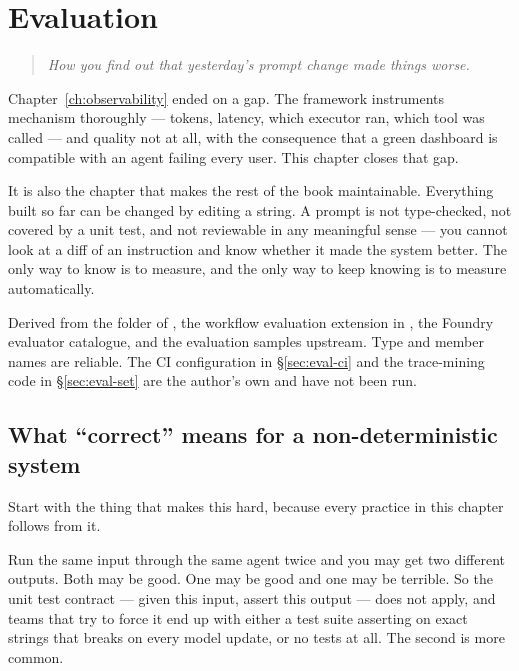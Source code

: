 \chapter{Evaluation}
\label{ch:evaluation}

\begin{quote}\itshape
How you find out that yesterday's prompt change made things worse.
\end{quote}

\noindent
Chapter~\ref{ch:observability} ended on a gap. The framework instruments
mechanism thoroughly --- tokens, latency, which executor ran, which tool was
called --- and quality not at all, with the consequence that a green dashboard is
compatible with an agent failing every user. This chapter closes that gap.

It is also the chapter that makes the rest of the book maintainable. Everything
built so far can be changed by editing a string. A prompt is not type-checked, not
covered by a unit test, and not reviewable in any meaningful sense --- you cannot
look at a diff of an instruction and know whether it made the system better. The
only way to know is to measure, and the only way to keep knowing is to measure
automatically.

\begin{verifybox}
Derived from the  folder of , the
workflow evaluation extension in , the Foundry
evaluator catalogue, and the evaluation samples upstream. Type and member names
are reliable. The CI configuration in \S\ref{sec:eval-ci} and the trace-mining
code in \S\ref{sec:eval-set} are the author's own and have not been run.
\end{verifybox}

\section{What ``correct'' means for a non-deterministic system}
\label{sec:eval-correct}

Start with the thing that makes this hard, because every practice in this chapter
follows from it.

Run the same input through the same agent twice and you may get two different
outputs. Both may be good. One may be good and one may be terrible. So the unit
test contract --- given this input, assert this output --- does not apply, and
teams that try to force it end up with either a test suite asserting on exact
strings that breaks on every model update, or no tests at all. The second is more
common.

